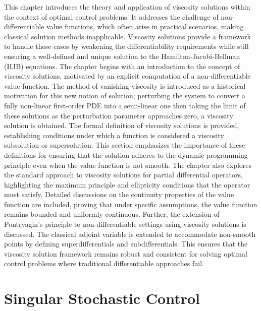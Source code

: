 \documentclass[12pt,a4paper,oneside]{book}
\numberwithin{theorem}{section}
\numberwithin{definition}{section}
\numberwithin{example}{section}
\numberwithin{exercise}{section}
\begin{document}
This chapter introduces the theory and application of viscosity solutions within the context of optimal control problems. It addresses the challenge of non-differentiable value functions, which often arise in practical scenarios, making classical solution methods inapplicable. Viscosity solutions provide a framework to handle these cases by weakening the differentiability requirements while still ensuring a well-defined and unique solution to the Hamilton-Jacobi-Bellman (HJB) equations. The chapter begins with an introduction to the concept of viscosity solutions, motivated by an explicit computation of a non-differentiable value function. The method of vanishing viscosity is introduced as a historical motivation for this new notion of solution; perturbing the system to convert a fully non-linear first-order PDE into a semi-linear one then taking the limit of these solutions as the perturbation parameter approaches zero, a viscosity solution is obtained. The formal definition of viscosity solutions is provided, establishing conditions under which a function is considered a viscosity subsolution or supersolution. This section emphasizes the importance of these definitions for ensuring that the solution adheres to the dynamic programming principle even when the value function is not smooth. The chapter also explores the standard approach to viscosity solutions for partial differential operators, highlighting the maximum principle and ellipticity conditions that the operator must satisfy. Detailed discussions on the continuity properties of the value function are included, proving that under specific assumptions, the value function remains bounded and uniformly continuous. Further, the extension of Pontryagin's principle to non-differentiable settings using viscosity solutions is discussed. The classical adjoint variable is extended to accommodate non-smooth points by defining superdifferentials and subdifferentials. This ensures that the viscosity solution framework remains robust and consistent for solving optimal control problems where traditional differentiable approaches fail.



\newpage

\chapter{Singular Stochastic Control}

\end{document}
